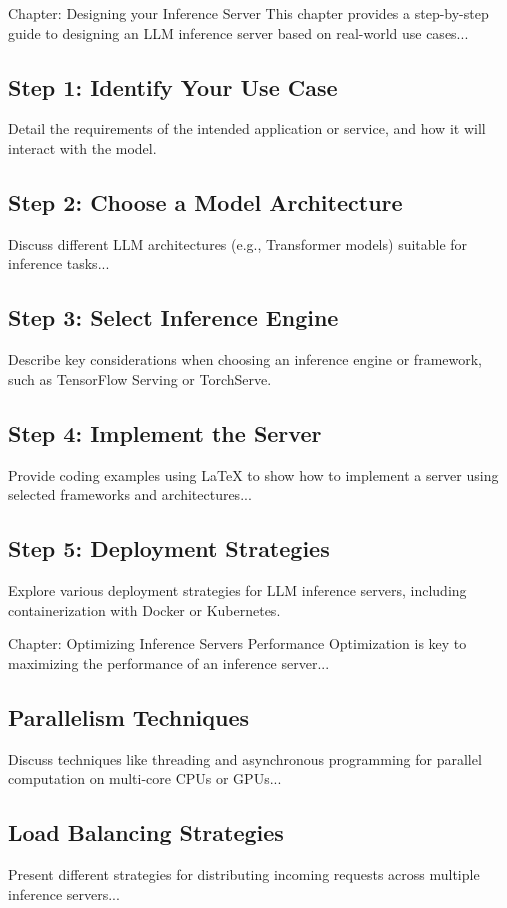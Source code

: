 Chapter: Designing your Inference Server
This chapter provides a step-by-step guide to designing an LLM inference server based on real-world use cases...


\subsection{Step 1: Identify Your Use Case}
Detail the requirements of the intended application or service, and how it will interact with the model.


\subsection{Step 2: Choose a Model Architecture}
Discuss different LLM architectures (e.g., Transformer models) suitable for inference tasks...


\subsection{Step 3: Select Inference Engine}
Describe key considerations when choosing an inference engine or framework, such as TensorFlow Serving or TorchServe.


\subsection{Step 4: Implement the Server}
Provide coding examples using LaTeX to show how to implement a server using selected frameworks and architectures...


\subsection{Step 5: Deployment Strategies}
Explore various deployment strategies for LLM inference servers, including containerization with Docker or Kubernetes.


Chapter: Optimizing Inference Servers Performance
Optimization is key to maximizing the performance of an inference server...


\subsection{Parallelism Techniques}
Discuss techniques like threading and asynchronous programming for parallel computation on multi-core CPUs or GPUs...


\subsection{Load Balancing Strategies}
Present different strategies for distributing incoming requests across multiple inference servers...


